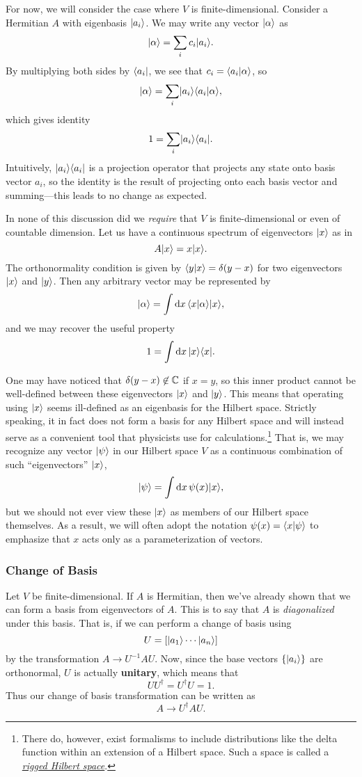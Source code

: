 For now, we will consider the case where $V$ is finite-dimensional. Consider a Hermitian $A$ with eigenbasis $\lvert a_i \rangle$. We may write any vector $\lvert \alpha \rangle$ as
$$\lvert \alpha \rangle = \sum_{i} c_{i} \lvert a_i \rangle.$$
By multiplying both sides by $\langle a_i \rvert$, we see that $c_i = \langle a_i\vert\alpha \rangle$, so
$$\lvert \alpha \rangle = \sum_{i} \lvert a_i \rangle \langle a_i\vert\alpha \rangle,$$
which gives identity
\begin{equation}
    1 = \sum_i \lvert a_i \rangle\langle a_i \rvert.
    \label{eqn:projection-identity}
\end{equation}
Intuitively, $\lvert a_i \rangle\langle a_i \rvert$ is a projection operator that projects any state onto basis vector $a_i$, so the identity is the result of projecting onto each basis vector and summing---this leads to no change as expected.

In none of this discussion did we \emph{require} that $V$ is finite-dimensional or even of countable dimension. Let us have a continuous spectrum of eigenvectors $\lvert x \rangle$ as in
$$A\lvert x \rangle = x \lvert x \rangle.$$
The orthonormality condition is given by $\langle y\vert x \rangle = \delta(y - x)$ for two eigenvectors $\lvert x \rangle$ and $\lvert y \rangle$.
Then any arbitrary vector may be represented by
$$\lvert \alpha \rangle = \int \mathrm dx\, \langle x\vert\alpha \rangle \lvert x \rangle,$$
and we may recover the useful property
$$1 = \int \mathrm dx\, \lvert x \rangle\langle x \rvert.$$

One may have noticed that $\delta(y - x) \not\in \mathbb{C}$ if $x = y$, so this inner product cannot be well-defined between these eigenvectors $\lvert x \rangle$ and $\lvert y \rangle$. This means that operating using $\lvert x \rangle$ seems ill-defined as an eigenbasis for the Hilbert space. Strictly speaking, it in fact does not form a basis for any Hilbert space and will instead serve as a convenient tool that physicists use for calculations.\footnote{There do, however, exist formalisms to include distributions like the delta function within an extension of a Hilbert space. Such a space is called a \href{https://en.wikipedia.org/wiki/Rigged_Hilbert_space}{\emph{rigged Hilbert space}}.} That is, we may recognize any vector $\lvert \psi \rangle$ in our Hilbert space $V$ as a continuous combination of such ``eigenvectors'' $\lvert x \rangle$,
$$\lvert \psi \rangle = \int \mathrm dx\, \psi(x) \lvert x \rangle,$$
but we should not ever view these $\lvert x \rangle$ as members of our Hilbert space themselves. As a result, we will often adopt the notation $\psi(x) = \langle x\vert\psi \rangle$ to emphasize that $x$ acts only as a parameterization of vectors.

\subsubsection{Change of Basis}
Let $V$ be finite-dimensional. If $A$ is Hermitian, then we've already shown that we can form a basis from eigenvectors of $A$. This is to say that $A$ is \emph{diagonalized} under this basis. That is, if we can perform a change of basis using
$$U = [\lvert a_1 \rangle \cdots \lvert a_n \rangle]$$
by the transformation $A\to U^{-1} A U$. Now, since the base vectors $\{\lvert a_i \rangle\}$ are orthonormal, $U$ is actually \textbf{unitary}, which means that $$UU^\dagger = U^\dagger U = 1.$$ Thus our change of basis transformation can be written as
\begin{equation}
A\to U^\dagger A U.
\end{equation}

